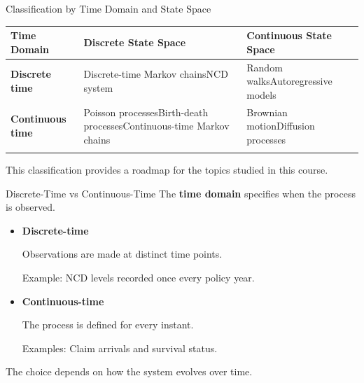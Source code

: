 \documentclass[
  ignorenonframetext,
  aspectratio=169,
]{beamer}
\newcounter{none} %
\begin{document}
\begin{frame}{Classification by Time Domain and State Space}
\protect{}\label{classification-by-time-domain-and-state-space}
{\def\LTcaptype{none} %
\begin{longtable}[]{@{}
  >{\raggedright\arraybackslash}p{}
  >{\raggedright\arraybackslash}p{}
  >{\raggedright\arraybackslash}p{}@{}}
\toprule\noalign{}
\begin{minipage}[b]{\linewidth}\raggedright
Time Domain
\end{minipage} & \begin{minipage}[b]{\linewidth}\raggedright
Discrete State Space
\end{minipage} & \begin{minipage}[b]{\linewidth}\raggedright
Continuous State Space
\end{minipage} \\
\midrule\noalign{}
\endhead
\textbf{Discrete time} & Discrete-time Markov chainsNCD system & Random
walksAutoregressive models \\
\textbf{Continuous time} & Poisson processesBirth-death
processesContinuous-time Markov chains & Brownian motionDiffusion
processes \\
\bottomrule\noalign{}
\end{longtable}
}

This classification provides a roadmap for the topics studied in this
course.
\end{frame}

\begin{frame}{Discrete-Time vs Continuous-Time}
\protect{}\label{discrete-time-vs-continuous-time}
The \textbf{time domain} specifies when the process is observed.

\begin{itemize}
\item
  \textbf{Discrete-time}

  Observations are made at distinct time points.

  Example: NCD levels recorded once every policy year.
\item
  \textbf{Continuous-time}

  The process is defined for every instant.

  Examples: Claim arrivals and survival status.
\end{itemize}

The choice depends on how the system evolves over time.
\end{frame}
\end{document}
